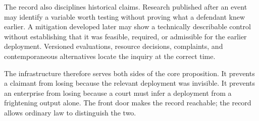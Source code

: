 The record also disciplines historical claims. Research published after an event may identify a variable worth testing without proving what a defendant knew earlier. A mitigation developed later may show a technically describable control without establishing that it was feasible, required, or admissible for the earlier deployment. Versioned evaluations, resource decisions, complaints, and contemporaneous alternatives locate the inquiry at the correct time.

The infrastructure therefore serves both sides of the core proposition. It prevents a claimant from losing because the relevant deployment was invisible. It prevents an enterprise from losing because a court must infer a deployment from a frightening output alone. The front door makes the record reachable; the record allows ordinary law to distinguish the two.

